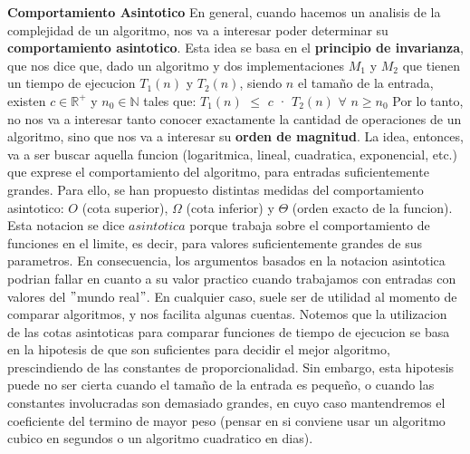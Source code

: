 \documentclass[10pt,a4paper]{article}
\begin{document}
\textbf{Comportamiento Asintotico}
\newline
\newline
En general, cuando hacemos un analisis de la complejidad de un algoritmo, nos va a interesar poder determinar su \textbf{comportamiento asintotico}. Esta idea se basa en el \textbf{principio de invarianza}, que nos dice que, dado un algoritmo y dos implementaciones $M_{1}$ y $M_{2}$ que tienen un tiempo de ejecucion $T_{1}(n)$ y $T_{2}(n)$, siendo $n$ el tamaño de la entrada, existen $c \in \mathbb{R}^{+}$  y $n_{0} \in \mathbb{N}$ tales que:
\newline
\newline
$T_{1}(n)$ $\leq$ $c$ · $T_{2}(n)$ $\forall$ $n \geq n_{0}$
\newline
\newline
Por lo tanto, no nos va a interesar tanto conocer exactamente la cantidad de operaciones de un algoritmo, sino que nos va a interesar su \textbf{orden de magnitud}. La idea, entonces, va a ser buscar aquella funcion (logaritmica, lineal, cuadratica, exponencial, etc.) que exprese el comportamiento del algoritmo, para entradas suficientemente grandes. Para ello, se han propuesto distintas medidas del comportamiento asintotico: $O$ (cota superior), $\Omega$ (cota inferior) y $\Theta$ (orden exacto de la funcion).
\newline
\newline
Esta notacion se dice $asintotica$ porque trabaja sobre el comportamiento de funciones en el limite, es decir, para valores suficientemente grandes de sus parametros. En consecuencia, los argumentos basados en la notacion asintotica podrian fallar en cuanto a su valor practico cuando trabajamos con entradas con valores del $"$mundo real$"$. En cualquier caso, suele ser de utilidad al momento de comparar algoritmos, y nos facilita algunas cuentas. Notemos que la utilizacion de las cotas asintoticas para comparar funciones
de tiempo de ejecucion se basa en la hipotesis de que son suficientes para decidir el mejor algoritmo, prescindiendo de las constantes de proporcionalidad. Sin embargo, esta hipotesis puede no ser cierta cuando el tamaño de la entrada es pequeño, o cuando las constantes involucradas son demasiado grandes, en cuyo caso mantendremos el coeficiente del termino de mayor peso (pensar en si conviene usar un algoritmo cubico en segundos o un algoritmo cuadratico en dias).
\newline
\newline
\end{document}

